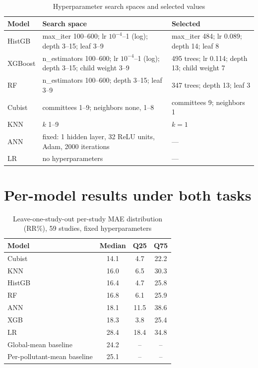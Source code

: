 \documentclass[12pt]{article}
\begin{document}
\begin{table}[h]
\centering
\caption{Hyperparameter search spaces and selected values}
\begin{tabular}{lll}
\toprule
Model & Search space & Selected \\
\midrule
HistGB & max\_iter 100--600; lr $10^{-4}$--1 (log); depth 3--15; leaf 3--9 &
  max\_iter 484; lr 0.089; depth 14; leaf 8 \\
XGBoost & n\_estimators 100--600; lr $10^{-4}$--1 (log); depth 3--15;
  child weight 3--9 & 495 trees; lr 0.114; depth 13; child weight 7 \\
RF & n\_estimators 100--600; depth 3--15; leaf 3--9 &
  347 trees; depth 13; leaf 3 \\
Cubist & committees 1--9; neighbors none, 1--8 & committees 9; neighbors 1 \\
KNN & $k$ 1--9 & $k = 1$ \\
ANN & fixed: 1 hidden layer, 32 ReLU units, Adam, 2000 iterations & --- \\
LR & no hyperparameters & --- \\
\bottomrule
\end{tabular}
\end{table}

\section{Per-model results under both tasks}

\begin{table}[h]
\centering
\caption{Leave-one-study-out per-study MAE distribution (RR\%),
59 studies, fixed hyperparameters}
\begin{tabular}{lccc}
\toprule
Model & Median & Q25 & Q75 \\
\midrule
Cubist & 14.1 & 4.7 & 22.2 \\
KNN    & 16.0 & 6.5 & 30.3 \\
HistGB & 16.4 & 4.7 & 25.8 \\
RF     & 16.8 & 6.1 & 25.9 \\
ANN    & 18.1 & 11.5 & 38.6 \\
XGB    & 18.3 & 3.8 & 25.4 \\
LR     & 28.4 & 18.4 & 34.8 \\
\midrule
Global-mean baseline & 24.2 & -- & -- \\
Per-pollutant-mean baseline & 25.1 & -- & -- \\
\bottomrule
\end{tabular}
\end{table}
\end{document}
